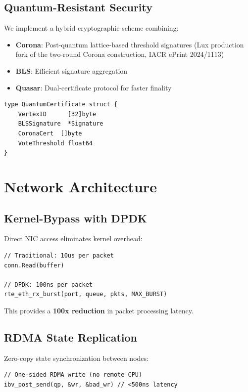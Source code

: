 \documentclass[11pt,a4paper]{article}
\begin{document}
\subsection{Quantum-Resistant Security}

We implement a hybrid cryptographic scheme combining:

\begin{itemize}
    \item \textbf{Corona}: Post-quantum lattice-based threshold signatures (Lux production fork of the two-round Corona construction, IACR ePrint 2024/1113)
    \item \textbf{BLS}: Efficient signature aggregation
    \item \textbf{Quasar}: Dual-certificate protocol for faster finality
\end{itemize}

\begin{lstlisting}
type QuantumCertificate struct {
    VertexID      [32]byte
    BLSSignature  *Signature
    CoronaCert  []byte
    VoteThreshold float64
}
\end{lstlisting}

\section{Network Architecture}

\subsection{Kernel-Bypass with DPDK}

Direct NIC access eliminates kernel overhead:

\begin{lstlisting}
// Traditional: 10us per packet
conn.Read(buffer)

// DPDK: 100ns per packet
rte_eth_rx_burst(port, queue, pkts, MAX_BURST)
\end{lstlisting}

This provides a \textbf{100x reduction} in packet processing latency.

\subsection{RDMA State Replication}

Zero-copy state synchronization between nodes:

\begin{lstlisting}
// One-sided RDMA write (no remote CPU)
ibv_post_send(qp, &wr, &bad_wr) // <500ns latency
\end{lstlisting}
\end{document}
